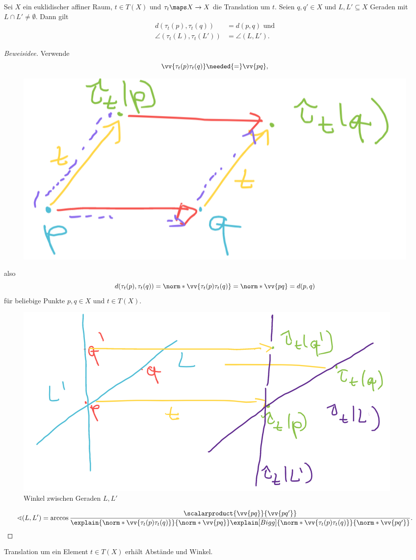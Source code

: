 \begin{lemma}
  Sei \( X \) ein euklidischer affiner Raum, \( t\in T(X) \) und \( \tau_t\maps X\to X \) die Translation um \( t \). Seien \( q,q'\in X \) und \( L,L'\subseteq X \) Geraden mit \( L\cap L'\neq \emptyset \). Dann gilt 
  \begin{align*}
    d(\tau_t(p),\tau_t(q))&=d(p,q)\text{ und}\\
    \angle (\tau_t(L),\tau_t(L'))&=\angle(L,L').
  \end{align*}
\end{lemma}
\begin{proof}[Beweisidee]
  Verwende
  \begin{equation*}
    \vv{\tau_t(p) \tau_t(q)}\needed{=}\vv{pq},
  \end{equation*}
  \begin{figure}[H]
    \centering
    \includegraphics[width=0.5\linewidth]{figures/translation_erhaelt_winkel_beweis_translation_erhaelt_verschiebungen}
    \label{fig:translation_erhaelt_winkel_beweis_translation_erhaelt_verschiebungen}
  \end{figure}
  also
  \begin{equation*}
    d(\tau_t(p),\tau_t(q))=\norm*{\vv{\tau_t(p)\tau_t(q)}}=\norm*{\vv{pq}}=d(p,q)
  \end{equation*}
  für beliebige Punkte \( p,q\in X \) und \( t\in T(X) \).
  \begin{figure}[H]
    \centering
    \includegraphics[width=0.5\linewidth]{figures/translation_erhaelt_winkel_beweis_winkel_zwischen_geraden}
    \caption*{Winkel zwischen Geraden \( L,L' \)}
    \label{fig:translation_erhaelt_winkel_beweis_winkel_zwischen_geraden}
  \end{figure}
  \begin{equation*}
    \angle(L,L')=\arccos \frac{\scalarproduct{\vv{pq}}{\vv{pq'}}}{\explain{\norm*{\vv{\tau_t(p)\tau_t(q)}}}{\norm*{\vv{pq}}}\explain[Bigg]{\norm*{\vv{\tau_t(p)\tau_t(q)}}}{\norm*{\vv{pq'}}}}.
  \end{equation*}
\end{proof}
 Translation um ein Element \( t\in T(X) \) erhält Abstände und Winkel.


